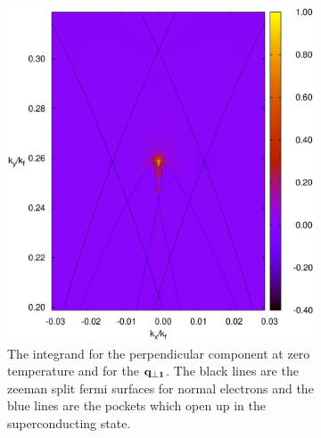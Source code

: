\documentclass[usletter,aps,prb,10pt,amssymb,amsmath,twocolumn]{revtex4-1}
\begin{document}
\begin{figure}
\caption{$\delta \chi$ integrands}\label{fig:integrand}
        \centering
        \begin{subfigure}[b]{0.23\textwidth}

                \includegraphics[scale = 0.2]{./figures/difference_perp1.eps}
                \caption{The integrand for the perpendicular component at zero temperature and for the $\bf{q}_{\perp 1}$. The black lines are the zeeman split fermi surfaces for normal electrons and the blue lines are the pockets which open up in the superconducting state.}
        \end{subfigure}
         \begin{subfigure}[b]{0.23\textwidth}


\end{subfigure}
\end{figure}
\end{document}
